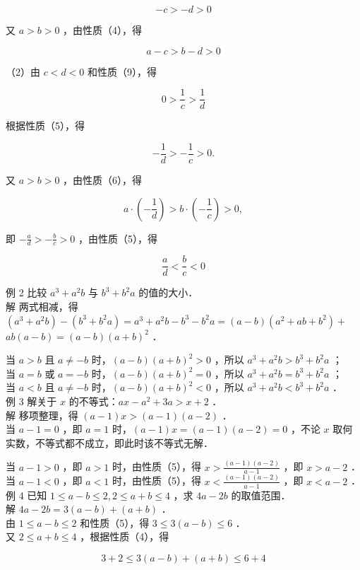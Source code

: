 \documentclass[10pt]{article}
\begin{document}
\[
-c>-d>0
\]

又 \(a>b>0\) ，由性质（4），得

\[
a-c>b-d>0
\]

（2）由 \(c<d<0\) 和性质（9），得

\[
0>\frac{1}{c}>\frac{1}{d}
\]

根据性质（5），得

\[
-\frac{1}{d}>-\frac{1}{c}>0 .
\]

又 \(a>b>0\) ，由性质（6），得

\[
a \cdot\left(-\frac{1}{d}\right)>b \cdot\left(-\frac{1}{c}\right)>0,
\]

即 \(-\frac{a}{d}>-\frac{b}{c}>0\) ，由性质（5），得

\[
\frac{a}{d}<\frac{b}{c}<0
\]

例 2 比较 \(a^{3}+a^{2} b\) 与 \(b^{3}+b^{2} a\) 的值的大小．\\
解 两式相减，得 \(\left(a^{3}+a^{2} b\right)-\left(b^{3}+b^{2} a\right)=a^{3}+a^{2} b-b^{3}-b^{2} a=(a-b)\left(a^{2}+a b+b^{2}\right)+\) \(a b(a-b)=(a-b)(a+b)^{2}\) ．

当 \(a>b\) 且 \(a \neq-b\) 时，\((a-b)(a+b)^{2}>0\) ，所以 \(a^{3}+a^{2} b>b^{3}+b^{2} a\) ；\\
当 \(a=b\) 或 \(a=-b\) 时，\((a-b)(a+b)^{2}=0\) ，所以 \(a^{3}+a^{2} b=b^{3}+b^{2} a\) ；\\
当 \(a<b\) 且 \(a \neq-b\) 时，\((a-b)(a+b)^{2}<0\) ，所以 \(a^{3}+a^{2} b<b^{3}+b^{2} a\) ．\\
例 3 解关于 \(x\) 的不等式：\(a x-a^{2}+3 a>x+2\) ．\\
解 移项整理，得 \((a-1) x>(a-1)(a-2)\) ．\\
当 \(a-1=0\) ，即 \(a=1\) 时，\((a-1) x=(a-1)(a-2)=0\) ，不论 \(x\) 取何实数，不等式都不成立，即此时该不等式无解．

当 \(a-1>0\) ，即 \(a>1\) 时，由性质（5），得 \(x>\frac{(a-1)(a-2)}{a-1}\) ，即 \(x>a-2\) ．\\
当 \(a-1<0\) ，即 \(a<1\) 时，由性质（5），得 \(x<\frac{(a-1)(a-2)}{a-1}\) ，即 \(x<a-2\) ．\\
例 4 已知 \(1 \leqslant a-b \leqslant 2,2 \leqslant a+b \leqslant 4\) ，求 \(4 a-2 b\) 的取值范围．\\
解 \(4 a-2 b=3(a-b)+(a+b)\) ．\\
由 \(1 \leqslant a-b \leqslant 2\) 和性质（5），得 \(3 \leqslant 3(a-b) \leqslant 6\) ．\\
又 \(2 \leqslant a+b \leqslant 4\) ，根据性质（4），得

\[
3+2 \leqslant 3(a-b)+(a+b) \leqslant 6+4
\]
\end{document}
